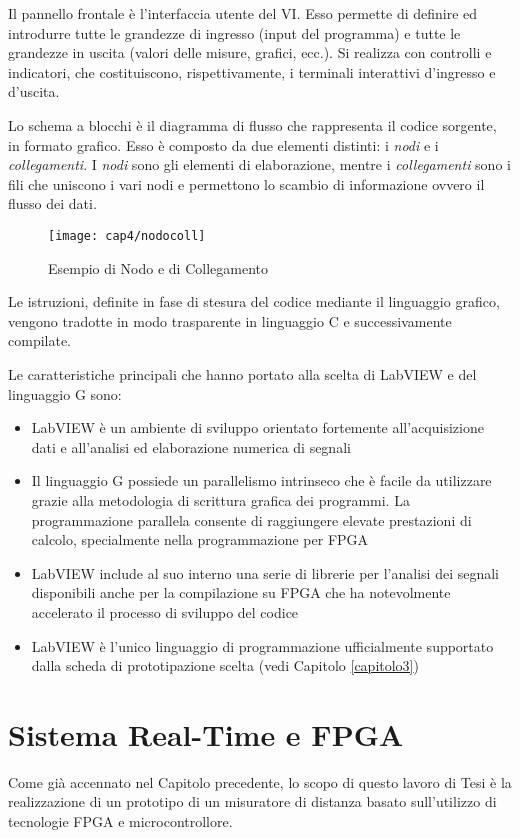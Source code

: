 Il pannello frontale è l'interfaccia utente del VI. Esso permette di definire ed introdurre tutte le grandezze di ingresso (input del programma) e tutte le grandezze in uscita (valori delle misure, grafici, ecc.). Si realizza con controlli e indicatori, che costituiscono, rispettivamente, i terminali interattivi d'ingresso e d'uscita.
 
Lo schema a blocchi è il diagramma di flusso che rappresenta il codice sorgente, in formato grafico. Esso è composto da due elementi distinti: i \textit{nodi} e i \textit{collegamenti}. I \textit{nodi} sono gli elementi di elaborazione, mentre i \textit{collegamenti} sono i fili che uniscono i vari nodi e permettono lo scambio di informazione ovvero il flusso dei dati.

\begin{figure}[H] 
  \begin{center}
    \texttt{[image: cap4/nodocoll]}
    \caption{Esempio di Nodo e di Collegamento}
    \label{nodocoll}
  \end{center}
\end{figure}

Le istruzioni, definite in fase di stesura del codice mediante il linguaggio grafico, vengono tradotte in modo trasparente in linguaggio C e successivamente compilate.

Le caratteristiche principali che hanno portato alla scelta di LabVIEW e del linguaggio G sono:
\begin{itemize}
	\item LabVIEW è un ambiente di sviluppo orientato fortemente all'acquisizione dati e all'analisi ed elaborazione numerica di segnali
	\item Il linguaggio G possiede un parallelismo intrinseco che è facile da utilizzare grazie alla metodologia di scrittura grafica dei programmi. La programmazione parallela consente di raggiungere elevate prestazioni di calcolo, specialmente nella programmazione per FPGA
	\item LabVIEW include al suo interno una serie di librerie per l'analisi dei segnali disponibili anche per la compilazione su FPGA che ha notevolmente accelerato il processo di sviluppo del codice
	\item LabVIEW è l'unico linguaggio di programmazione ufficialmente supportato dalla scheda di prototipazione scelta (vedi Capitolo \ref{capitolo3})
\end{itemize}

\section{Sistema Real-Time e FPGA}
Come già accennato nel Capitolo precedente, lo scopo di questo lavoro di Tesi è la realizzazione di un prototipo di un misuratore di distanza basato sull'utilizzo di tecnologie FPGA e microcontrollore.


